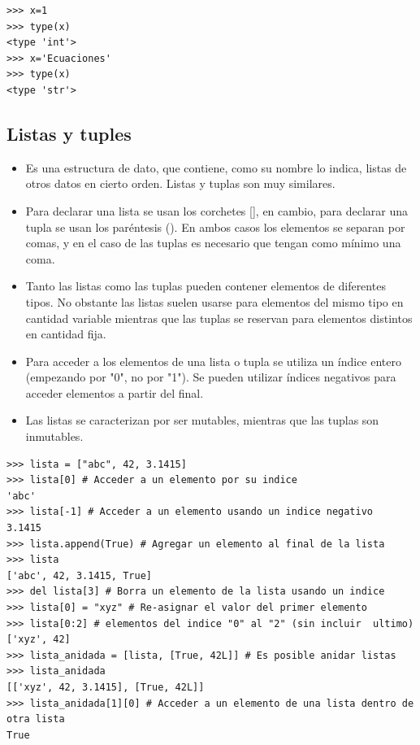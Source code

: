  \begin{lstlisting}
>>> x=1
>>> type(x)
<type 'int'>
>>> x='Ecuaciones'
>>> type(x)
<type 'str'>
\end{lstlisting}





\subsection{Listas y tuples}


\begin{itemize}

\item Es una estructura de dato, que contiene, como su nombre lo indica, listas de otros datos en cierto orden. Listas y tuplas son muy similares.

\item Para declarar una lista se usan los corchetes [], en cambio, para declarar una tupla se usan los paréntesis (). En ambos casos los elementos se separan por comas, y en el caso de las tuplas es necesario que tengan como mínimo una coma.

\item    Tanto las listas como las tuplas pueden contener elementos de diferentes tipos. No obstante las listas suelen usarse para elementos del mismo tipo en cantidad variable mientras que las tuplas se reservan para elementos distintos en cantidad fija.
    
\item Para acceder a los elementos de una lista o tupla se utiliza un índice entero (empezando por "0", no por "1"). Se pueden utilizar índices negativos para acceder elementos a partir del final.


\item Las listas se caracterizan por ser mutables, mientras que las tuplas son inmutables.

\end{itemize}






\begin{lstlisting}
>>> lista = ["abc", 42, 3.1415]
>>> lista[0] # Acceder a un elemento por su indice
'abc'
>>> lista[-1] # Acceder a un elemento usando un indice negativo
3.1415
>>> lista.append(True) # Agregar un elemento al final de la lista
>>> lista
['abc', 42, 3.1415, True]
>>> del lista[3] # Borra un elemento de la lista usando un indice
>>> lista[0] = "xyz" # Re-asignar el valor del primer elemento
>>> lista[0:2] # elementos del indice "0" al "2" (sin incluir  ultimo)
['xyz', 42]
>>> lista_anidada = [lista, [True, 42L]] # Es posible anidar listas
>>> lista_anidada
[['xyz', 42, 3.1415], [True, 42L]]
>>> lista_anidada[1][0] # Acceder a un elemento de una lista dentro de otra lista
True
\end{lstlisting}

